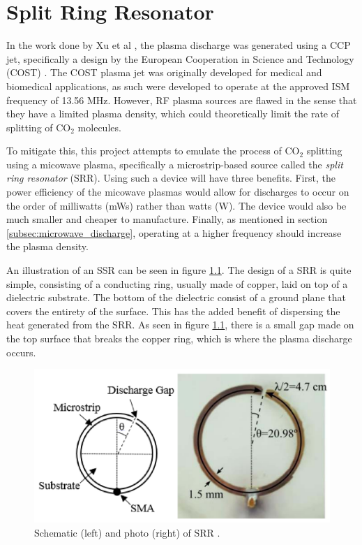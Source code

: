 \chapter{Split Ring Resonator}


In the work done by Xu et al \cite{Xu2021}, the plasma discharge was generated using a CCP jet, specifically a design by the European Cooperation in Science and Technology (COST) \cite{Gorbanev2019}. The COST plasma jet was originally developed for medical and biomedical applications, as such were developed to operate at the approved ISM frequency of 13.56 MHz. However, RF plasma sources are flawed in the sense that they have a limited plasma density, which could theoretically limit the rate of splitting of CO$_2$ molecules.

To mitigate this, this project attempts to emulate the process of CO$_2$ splitting using a micowave plasma, specifically a microstrip-based source called the \textit{split ring resonator} (SRR). Using such a device will have three benefits. First, the power efficiency of the micowave plasmas would allow for discharges to occur on the order of milliwatts (mWs) rather than watts (W). The device would also be much smaller and cheaper to manufacture. Finally, as mentioned in section \ref{subsec:microwave_discharge}, operating at a higher frequency should increase the plasma density.

An illustration of an SSR can be seen in figure \ref{fig:SRR}. The design of a SRR is quite simple, consisting of a conducting ring, usually made of copper, laid on top of a dielectric substrate. The bottom of the dielectric consist of a ground plane that covers the entirety of the surface. This has the added benefit of dispersing the heat generated from the SRR. As seen in figure \ref{fig:SRR}, there is a small gap made on the top surface that breaks the copper ring, which is where the plasma discharge occurs. 


\begin{figure}[h!]
	\centering
	\includegraphics[width=0.7\linewidth]{chapter_4/figures/split_ring_resonator.png}
	\caption{Schematic (left) and photo (right) of SRR \cite{Dextre2017}.}
	\label{fig:SRR}
\end{figure}

